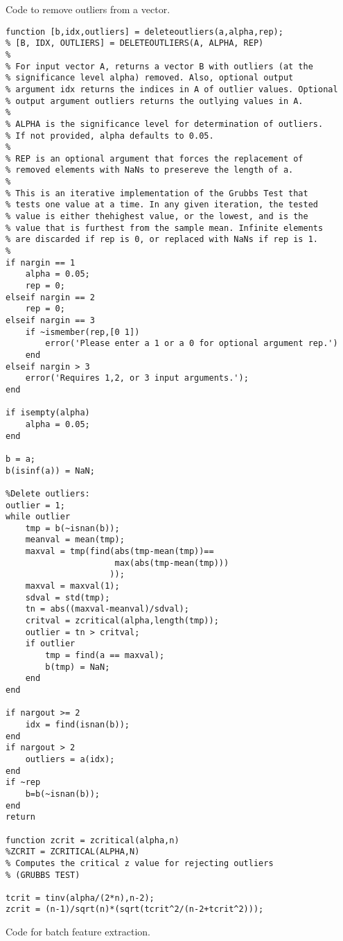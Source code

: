 \clearpage

Code to remove outliers from a vector.

\begin{verbatim}
function [b,idx,outliers] = deleteoutliers(a,alpha,rep);
% [B, IDX, OUTLIERS] = DELETEOUTLIERS(A, ALPHA, REP)
% 
% For input vector A, returns a vector B with outliers (at the
% significance level alpha) removed. Also, optional output 
% argument idx returns the indices in A of outlier values. Optional
% output argument outliers returns the outlying values in A.
%
% ALPHA is the significance level for determination of outliers.
% If not provided, alpha defaults to 0.05.
% 
% REP is an optional argument that forces the replacement of
% removed elements with NaNs to presereve the length of a.
%
% This is an iterative implementation of the Grubbs Test that
% tests one value at a time. In any given iteration, the tested 
% value is either thehighest value, or the lowest, and is the
% value that is furthest from the sample mean. Infinite elements
% are discarded if rep is 0, or replaced with NaNs if rep is 1.
% 
if nargin == 1
	alpha = 0.05;
	rep = 0;
elseif nargin == 2
	rep = 0;
elseif nargin == 3
	if ~ismember(rep,[0 1])
		error('Please enter a 1 or a 0 for optional argument rep.')
	end
elseif nargin > 3
	error('Requires 1,2, or 3 input arguments.');
end

if isempty(alpha)
	alpha = 0.05;
end

b = a;
b(isinf(a)) = NaN;

%Delete outliers:
outlier = 1;
while outlier
	tmp = b(~isnan(b));
	meanval = mean(tmp);
	maxval = tmp(find(abs(tmp-mean(tmp))==
				      max(abs(tmp-mean(tmp)))
				     ));
	maxval = maxval(1);
	sdval = std(tmp);
	tn = abs((maxval-meanval)/sdval);
	critval = zcritical(alpha,length(tmp));
	outlier = tn > critval;
	if outlier
		tmp = find(a == maxval);
		b(tmp) = NaN;
	end
end

if nargout >= 2
	idx = find(isnan(b));
end
if nargout > 2
	outliers = a(idx);
end
if ~rep
	b=b(~isnan(b));
end
return

function zcrit = zcritical(alpha,n)
%ZCRIT = ZCRITICAL(ALPHA,N)
% Computes the critical z value for rejecting outliers
% (GRUBBS TEST)

tcrit = tinv(alpha/(2*n),n-2);
zcrit = (n-1)/sqrt(n)*(sqrt(tcrit^2/(n-2+tcrit^2)));
\end{verbatim}
\clearpage

Code for batch feature extraction.

